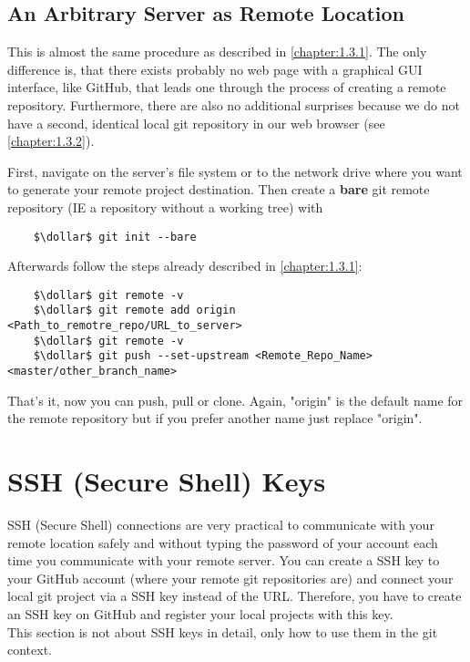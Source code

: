 \subsection{An Arbitrary Server as Remote Location}
\label{chapter:1.3.3}

This is almost the same procedure as described in \cref{chapter:1.3.1}. The only difference is, that there exists probably no web page with 
a graphical GUI interface, like GitHub, that leads one through the process of creating a remote repository. Furthermore, there are also no 
additional surprises because we do not have a second, identical local git repository in our web browser (see \cref{chapter:1.3.2}).

First, navigate on the server's file system or to the network drive where you want to generate your remote project destination. 
Then create a \textbf{bare} git remote repository (\ac{IE} a repository without a working tree) with
\begin{lstlisting}
	$\dollar$ git init --bare
\end{lstlisting}

Afterwards follow the steps already described in \cref{chapter:1.3.1}:
\begin{lstlisting}
	$\dollar$ git remote -v
	$\dollar$ git remote add origin <Path_to_remotre_repo/URL_to_server>
	$\dollar$ git remote -v
	$\dollar$ git push --set-upstream <Remote_Repo_Name> <master/other_branch_name>
\end{lstlisting}
That's it, now you can push, pull or clone. Again, "origin" is the default name for the remote repository but if you prefer another name just replace "origin".


\section{SSH (Secure Shell) Keys}
\label{chapter:1.4}

SSH (Secure Shell) connections are very practical to communicate with your remote location safely and without typing the password of your account each time you 
communicate with your remote server. You can create a SSH key to your GitHub account (where your remote git repositories are) and connect your local git project via 
a SSH key instead of the URL. Therefore, you have to create an SSH key on GitHub and register your local projects with this key.
\\
This section is not about SSH keys in detail, only how to use them in the git context. 


